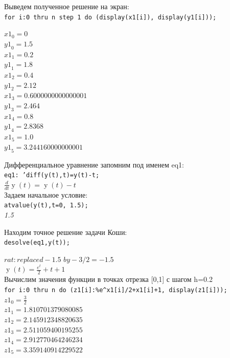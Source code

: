 \documentclass[article, bachelor, och, pract]{SCWorks}
\begin{document}
\begin{itemize}
Выведем полученное решение на экран:\\
\texttt{for i:0 thru n step 1 do
(display(x1[i]), display(y1[i]));}
\begin{flushleft}
\(\displaystyle
{{\mathit{x1}}_{0}}=0\) \\
\(
{{\mathit{y1}}_{0}}=1.5\) \\
\(
{{\mathit{x1}}_{1}}=0.2\) \\
\(
{{\mathit{y1}}_{1}}=1.8\) \\
\(
{{\mathit{x1}}_{2}}=0.4\) \\
\(
{{\mathit{y1}}_{2}}=2.12\) \\
\(
{{\mathit{x1}}_{3}}=0.6000000000000001\)\\
\({{\mathit{y1}}_{3}}=2.464\)\\
\({{\mathit{x1}}_{4}}=0.8\) \\
\({{\mathit{y1}}_{4}}=2.8368\) \\
\({{\mathit{x1}}_{5}}=1.0\) \\
\({{\mathit{y1}}_{5}}=3.244160000000001\mbox{}\)\\
\end{flushleft}
Дифференциальное уравнение запомним под именем eq1:\\
\texttt{eq1: 'diff(y(t),t)=y(t)-t;}\\
\(\frac{d}{dt}\operatorname{y}(t)=\operatorname{y}(t)-t\mbox{}
\)\\
Задаем начальное условие:\\
\texttt{atvalue(y(t),t=0, 1.5);}\\
\emph{1.5}

Находим точное решение задачи Коши:\\
\texttt{desolve(eq1,y(t));}

\(rat: replaced -1.5\) \(by -3/2 = -1.5\)\\
\(\operatorname{y}(t)=\frac{{e^{t}}}{2}+t+1\mbox{}
\)\\
Вычислим значения функции в точках отрезка [0,1] с шагом h=0.2 \\
\texttt{for i:0 thru n do (z1[i]:\%e\^{}x1[i]/2+x1[i]+1, display(z1[i]));}\\
\(\displaystyle
{{\mathit{z1}}_{0}}=\frac{3}{2}\)\\\(
{{\mathit{z1}}_{1}}=1.810701379080085\)\\\(
{{\mathit{z1}}_{2}}=2.145912348820635\)\\\(
{{\mathit{z1}}_{3}}=2.511059400195255\)\\\(
{{\mathit{z1}}_{4}}=2.912770464246234\)\\\(
{{\mathit{z1}}_{5}}=3.359140914229522\mbox{}\)


\end{itemize}
\end{document}
